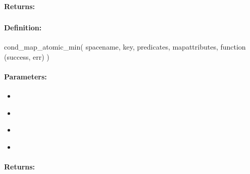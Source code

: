 \paragraph{Returns:}


\pagebreak
\subsubsection{}
\label{api:nodejs:cond_map_atomic_min}


\paragraph{Definition:}
\begin{javascriptcode}
cond_map_atomic_min(
        spacename, key, predicates, mapattributes, function (success, err) {})
\end{javascriptcode}
\paragraph{Parameters:}
\begin{itemize}[noitemsep]
\item {}\\

\item {}\\

\item {}\\

\item {}\\

\end{itemize}

\paragraph{Returns:}


\pagebreak
\subsubsection{}
\label{api:nodejs:group_map_atomic_min}


